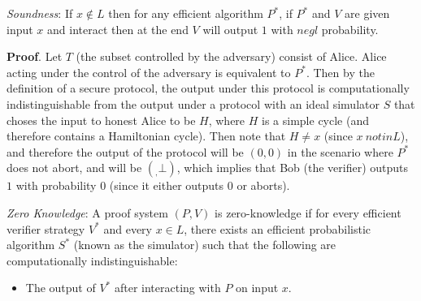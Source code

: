 \documentclass{article}
\begin{document}
\begin{enumerate}
\emph{Soundness}: If $x \notin L$ then for any efficient algorithm $P^*$, if $P^*$ and $V$ are given 
input $x$ and interact then at the end $V$ will output $1$ with $negl$ probability.%

\begin{mdbmarginx}{1ex}{0pt}{1ex}{0pt}%
\noindent{}\textbf{Proof}.  Let $T$ (the subset controlled by the adversary) consist of Alice. Alice acting under the control
of the adversary is equivalent to $P^*$. Then by the definition of a secure protocol, the output
under this protocol is computationally indistinguishable from the output under a protocol with an
ideal simulator $S$ that choses the input to honest Alice to be $H$, where $H$ is a simple
cycle (and therefore contains a Hamiltonian cycle). Then note that $H \neq x$ (since $x\ notin L$),
and therefore the output of the protocol will be $(0,0)$ in the scenario where $P^*$ does not
abort, and will be $(_,\bot)$, which implies that Bob (the
verifier) outputs $1$ with probability $0$ (since it either outputs $0$ or aborts).
\mdfloatright{\ensuremath{\Box}}%
\end{mdbmarginx}%

\emph{Zero Knowledge}: A proof system $(P,V)$ is zero-knowledge if for every efficient verifier strategy
$V^*$ and every $x \in L$, there exists an efficient probabilistic algorithm $S^*$ (known as the
simulator) such that the following are computationally indistinguishable:%

\begin{itemize}[noitemsep,topsep=\mdcompacttopsep]%

\item{}The output of $V^*$ after interacting with $P$ on input $x$.%


\end{itemize}
\end{enumerate}
\end{document}
